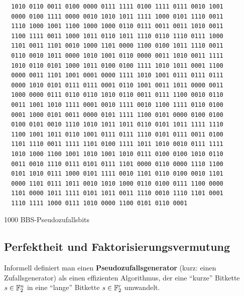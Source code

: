 \begin{refsegment}
\begin{table}[hbtp]
\begin{verbatim}
  1010 0110 0011 0100 0000 0111 1111 0100 1111 0111 0010 1001
  0000 0100 1111 0000 0010 1010 1011 1111 1000 0101 1110 0011
  1110 1000 1001 1100 1000 1000 0110 0111 0011 0011 1010 0011
  1100 1111 0011 1000 1011 0110 1011 1110 0110 1110 0111 1000
  1101 0011 1101 0010 1000 1101 0000 1100 0100 1011 1110 0011
  0110 0010 1011 0000 1010 1001 0110 0000 0011 1010 0011 1111
  1010 0110 0101 1000 1011 0100 0100 1111 1010 1011 0001 1100
  0000 0011 1101 1001 0001 0000 1111 1010 1001 0111 0111 0111
  0000 1010 0101 0111 0111 0001 0110 1001 0011 1011 0000 0011
  1000 0000 0111 0110 0110 1010 0110 0011 0111 1100 0010 0110
  0011 1001 1010 1111 0001 0010 1111 0010 1100 1111 0110 0100
  0001 1000 0101 0011 0000 0101 1111 1100 0101 0000 0100 0100
  0100 0101 0010 1110 1010 1011 1011 0110 0101 1011 1111 1110
  1100 1001 1011 0110 1001 0111 0111 1110 0101 0111 0011 0100
  1101 1110 0011 1111 1101 0100 1111 1011 1010 0010 0111 1111
  1010 1000 1100 1001 1010 1001 1010 0111 0100 0100 1010 0110
  0011 0010 1110 0111 0101 0111 1101 0000 0110 0000 1110 1100
  0101 1010 0111 1000 0101 1111 0010 1101 0110 0100 0010 1101
  0000 1101 0111 1011 0010 1010 1000 0110 0100 0111 1100 0000
  1101 0000 1011 1111 0101 1011 0011 1110 0010 1110 1101 0001
  1110 1111 1000 0111 1010 0000 1100 0101 0110 0001
\end{verbatim}
\caption{1000 BBS-Pseudozufallsbits} \label{tab-bool-bits1000}
\end{table}
\clearpage

\subsection{Perfektheit und Faktorisierungsvermutung}\label{ss-bool-perfqr}

Informell definiert man einen {\bf Pseudozufallsgenerator}
(kurz: einen Zufallsgenerator)
als einen effizienten Algorithmus, der eine
"`kurze"' Bitkette $s \in \mathbb{F}_2^n$ in eine "`lange"' Bitkette
$s \in \mathbb{F}_2^r$ umwandelt.


\end{refsegment}
